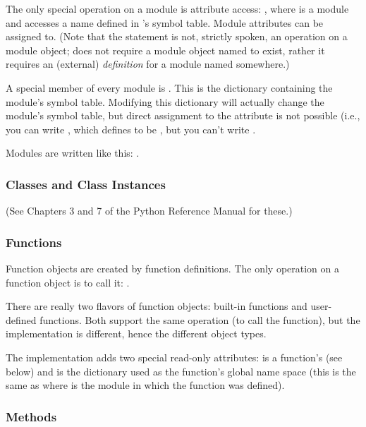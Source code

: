 The only special operation on a module is attribute access:
, where  is a module and  accesses
a name defined in 's symbol table.  Module attributes can be
assigned to.  (Note that the  statement is not, strictly
spoken, an operation on a module object;  does not
require a module object named  to exist, rather it requires
an (external) \emph{definition} for a module named 
somewhere.)

A special member of every module is .
This is the dictionary containing the module's symbol table.
Modifying this dictionary will actually change the module's symbol
table, but direct assignment to the  attribute is not
possible (i.e., you can write , which
defines  to be , but you can't write .

Modules are written like this: .

\subsubsection{Classes and Class Instances}

(See Chapters 3 and 7 of the Python Reference Manual for these.)

\subsubsection{Functions}

Function objects are created by function definitions.  The only
operation on a function object is to call it:
.

There are really two flavors of function objects: built-in functions
and user-defined functions.  Both support the same operation (to call
the function), but the implementation is different, hence the
different object types.

The implementation adds two special read-only attributes:
 is a function's  (see below) and
 is the dictionary used as the function's
global name space (this is the same as  where
 is the module in which the function  was defined).

\subsubsection{Methods}

